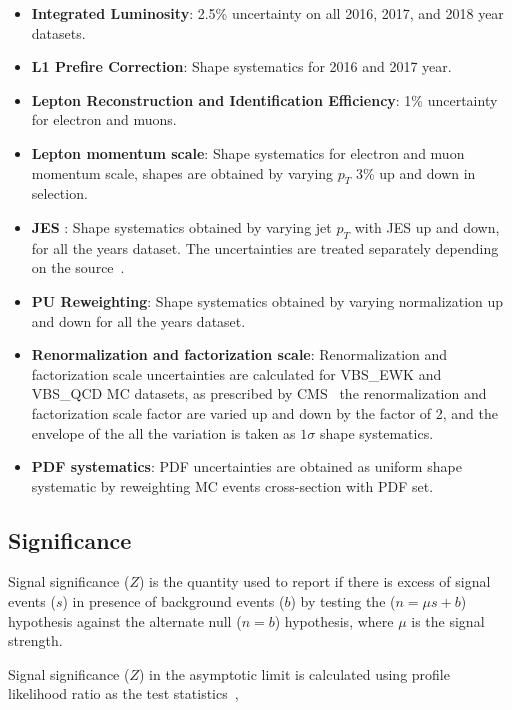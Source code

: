 \begin{itemize}
  \item \textbf{Integrated Luminosity}: 2.5\%
        uncertainty on all 2016, 2017, and 2018
        year datasets.
  \item \textbf{L1 Prefire Correction}: Shape systematics for 2016 and 2017
        year.
  \item \textbf{Lepton Reconstruction and Identification Efficiency}: 1\%
        uncertainty for electron and muons.
  \item \textbf{Lepton momentum scale}: Shape systematics for electron
        and muon momentum scale, shapes are obtained by varying \(p_T\) 3\% up and
        down in selection.
  \item \textbf{\gls{JES} }: Shape systematics
        obtained by varying jet \( p_T \) with \gls{JES} up and down,
        for all the years dataset. The uncertainties
        are treated separately depending on the source~\cite{CMS-DP-2020-019}.
  \item \textbf{PU Reweighting}: Shape systematics
        obtained by varying normalization up and down for all the years dataset.
  \item \textbf{Renormalization and factorization scale}:
        Renormalization and factorization scale uncertainties
        are calculated for VBS\_EWK and VBS\_QCD \gls{MC} datasets,
        as prescribed by \gls{CMS}~\cite{Ballestrero2018} the renormalization and factorization
        scale factor are varied up and down by the factor of 2,
        and the envelope of the all the variation is taken as \( 1\sigma \)
        shape systematics.
  \item \textbf{PDF systematics}: \gls{PDF} uncertainties
        are obtained as uniform shape systematic by reweighting \gls{MC} events cross-section
        with \gls{PDF} set.
\end{itemize}

\subsection{
  Significance
}

Signal significance (\( Z \)) is
the quantity used to report if there is excess of signal events (\( s \)) in
presence of background events (\( b \)) by testing the (\( n = \mu s + b \)) hypothesis
against the alternate null (\( n = b \)) hypothesis, where \( \mu \) is the signal strength.

Signal significance (\( Z \)) in the asymptotic limit
is calculated using profile likelihood ratio as the test statistics~\cite{Cowan2010},


